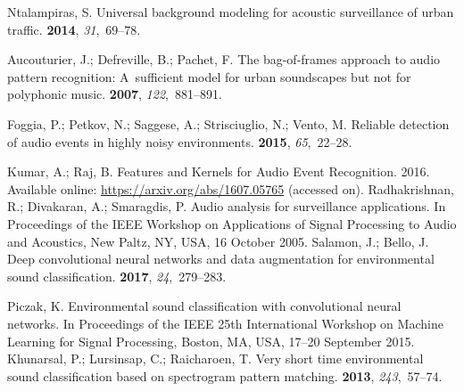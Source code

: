 \documentclass[sensors,article,accept,moreauthors,pdftex,10pt,a4paper]{mdpi}
\begin{document}
\begin{thebibliography}{999}
Ntalampiras, S.
\newblock Universal background modeling for acoustic surveillance of urban
  traffic.
 {\bf 2014}, {\em 31},~69--78.

Aucouturier, J.; Defreville, B.; Pachet, F.
\newblock The bag-of-frames approach to audio pattern recognition: A~sufficient
  model for urban soundscapes but not for polyphonic music.
 {\bf 2007}, {\em 122},~881--891.

Foggia, P.; Petkov, N.; Saggese, A.; Strisciuglio, N.; Vento, M.
\newblock Reliable detection of audio events in highly noisy environments.
 {\bf 2015}, {\em 65},~22--28.

Kumar, A.; Raj, B.
\newblock Features and Kernels for Audio Event Recognition. 2016. 
\newblock Available online: \mbox{\url{https://arxiv.org/abs/1607.05765}} ({accessed on}). 
Radhakrishnan, R.; Divakaran, A.; Smaragdis, P.
\newblock Audio analysis for surveillance applications.
\newblock  In Proceedings of the IEEE Workshop on Applications of Signal Processing to Audio and
  Acoustics, {New Paltz, NY, USA, 16 October} 2005.
Salamon, J.; Bello, J.
\newblock Deep convolutional neural networks and data augmentation for
  environmental sound classification.
 {\bf 2017}, {\em 24},~279--283.

Piczak, K.
\newblock Environmental sound classification with convolutional neural
  networks.
\newblock  In Proceedings of the IEEE 25th International Workshop on Machine Learning for Signal
  Processing, {Boston, MA, USA, 17--20 September }2015.
Khunarsal, P.; Lursinsap, C.; Raicharoen, T.
\newblock Very short time environmental sound classification based on
  spectrogram pattern matching.
 {\bf 2013}, {\em 243},~57--74.


\end{thebibliography}
\end{document}

